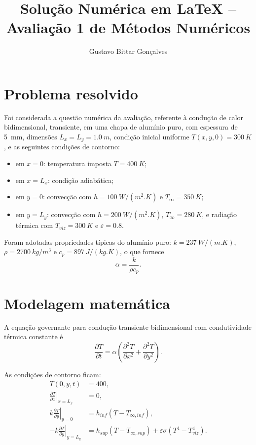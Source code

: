 \documentclass[12pt,a4paper]{article}
\title{Solução Numérica em \LaTeX{} -- Avaliação 1 de Métodos Numéricos}
\author{Gustavo Bittar Gonçalves}
\date{}
\begin{document}
\maketitle

\section{Problema resolvido}
Foi considerada a questão numérica da avaliação, referente à condução de calor bidimensional, transiente, em uma chapa de alumínio puro, com espessura de \SI{5}{mm}, dimensões $L_x=L_y=\SI{1.0}{m}$, condição inicial uniforme $T(x,y,0)=\SI{300}{K}$, e as seguintes condições de contorno:
\begin{itemize}
    \item em $x=0$: temperatura imposta $T=\SI{400}{K}$;
    \item em $x=L_x$: condição adiabática;
    \item em $y=0$: convecção com $h=\SI{100}{W/(m^2.K)}$ e $T_\infty=\SI{350}{K}$;
    \item em $y=L_y$: convecção com $h=\SI{200}{W/(m^2.K)}$, $T_\infty=\SI{280}{K}$, e radiação térmica com $T_{viz}=\SI{300}{K}$ e $\varepsilon=0.8$.
\end{itemize}

Foram adotadas propriedades típicas do alumínio puro: $k=\SI{237}{W/(m.K)}$, $\rho=\SI{2700}{kg/m^3}$ e $c_p=\SI{897}{J/(kg.K)}$, o que fornece
\[
\alpha = \frac{k}{\rho c_p}.
\]

\section{Modelagem matemática}
A equação governante para condução transiente bidimensional com condutividade térmica constante é
\begin{equation}
\frac{\partial T}{\partial t} = \alpha\left(\frac{\partial^2 T}{\partial x^2} + \frac{\partial^2 T}{\partial y^2}\right).
\end{equation}

As condições de contorno ficam:
\begin{align}
T(0,y,t) &= 400, \\
\left.\frac{\partial T}{\partial x}\right|_{x=L_x} &= 0, \\
k\left.\frac{\partial T}{\partial y}\right|_{y=0} &= h_{inf}\left(T-T_{\infty,inf}\right), \\
-k\left.\frac{\partial T}{\partial y}\right|_{y=L_y} &= h_{sup}\left(T-T_{\infty,sup}\right) + \varepsilon\sigma\left(T^4-T_{viz}^4\right).
\end{align}
\end{document}
